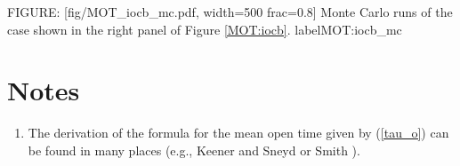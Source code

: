 FIGURE: [fig/MOT_iocb_mc.pdf, width=500 frac=0.8] Monte Carlo runs of the case shown in the right panel of Figure \ref{MOT:iocb}. label{MOT:iocb_mc}\section{Notes}

\begin{enumerate}
\item The derivation of the formula for the mean open time given by (\ref{tau_o}) can be found in many
places (e.g., Keener and Sneyd \cite{KeenerSneyd} or Smith \cite{Smith2002}). 
\end{enumerate}


